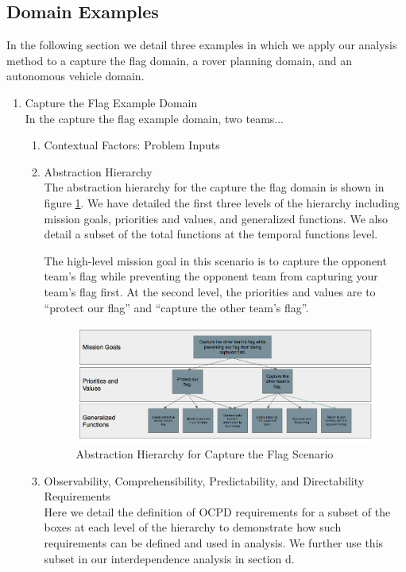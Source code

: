 \documentclass[letterpaper, 10 pt, conference]{ieeeconf}  %
\theoremstyle{definition}
\begin{document}
\subsection{Domain Examples}
In the following section we detail three examples in which we apply our analysis method to a capture the flag domain, a rover planning domain, and an autonomous vehicle domain. 
\begin{enumerate}
\item Capture the Flag Example Domain
\\In the capture the flag example domain, two teams...
\begin{enumerate}
    \item Contextual Factors: Problem Inputs
    \item Abstraction Hierarchy
    \\The abstraction hierarchy for the capture the flag domain is shown in figure \ref{fig:ctfah}. We have detailed the first three levels of the hierarchy including mission goals, priorities and values, and generalized functions. We also detail a subset of the total functions at the temporal functions level. %
    
    The high-level mission goal in this scenario is to capture the opponent team's flag while preventing the opponent team from capturing your team's flag first. At the second level, the priorities and values are to ``protect our flag'' and ``capture the other team's flag''.
    
   
    \begin{figure}[tb]
    \centering
    \includegraphics[width=\columnwidth]{ctfAH.png}
   \caption{Abstraction Hierarchy for Capture the Flag Scenario}
    \label{fig:ctfah}
    \end{figure}

    \item Observability, Comprehensibility, Predictability, and Directability Requirements
    \\Here we detail the definition of OCPD requirements for a subset of the boxes at each level of the hierarchy to demonstrate how such requirements can be defined and used in analysis. We further use this subset in our interdependence analysis in section d.
    

\end{enumerate}
\end{enumerate}
\end{document}
